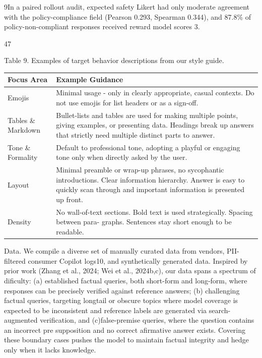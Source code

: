 \documentclass[
  10
]{article}
\newcounter{none} %
\begin{document}
9In a paired rollout audit, expected safety Likert had only moderate
agreement with the policy-compliance field (Pearson 0.293, Spearman
0.344), and 87.8\% of policy-non-compliant responses received reward
model scores 3.

47

Table 9. Examples of target behavior descriptions from our style guide.

{\def\LTcaptype{none} %
\begin{longtable}[]{@{}|l|l|@{}}
\toprule\noalign{}
\endhead
\bottomrule\noalign{}
\endlastfoot
\hline
Focus Area & Example Guidance \\
\hline
Emojis & Minimal usage - only in clearly appropriate, casual contexts.
Do not use emojis for list headers or as a sign-off. \\
\hline
Tables \& Markdown & Bullet-lists and tables are used for making
multiple points, giving examples, or presenting data. Headings break up
answers that strictly need multiple distinct parts to answer. \\
\hline
Tone \& Formality & Default to professional tone, adopting a playful or
engaging tone only when directly asked by the user. \\
\hline
Layout & Minimal preamble or wrap-up phrases, no sycophantic
introductions. Clear information hierarchy. Answer is easy to quickly
scan through and important information is presented up front. \\
\hline
Density & No wall-of-text sections. Bold text is used strategically.
Spacing between para- graphs. Sentences stay short enough to be
readable. \\
\hline
\end{longtable}
}

Data. We compile a diverse set of manually curated data from vendors,
PII-filtered consumer Copilot logs10, and synthetically generated data.
Inspired by prior work (Zhang et al., 2024; Wei et al., 2024b,c), our
data spans a spectrum of dificulty: (a) established factual queries,
both short-form and long-form, where responses can be precisely verified
against reference answers; (b) challenging factual queries, targeting
longtail or obscure topics where model coverage is expected to be
inconsistent and reference labels are generated via search-augmented
verification, and (c)false-premise queries, where the question contains
an incorrect pre supposition and no correct afirmative answer exists.
Covering these boundary cases pushes the model to maintain factual
integrity and hedge only when it lacks knowledge.
\end{document}
